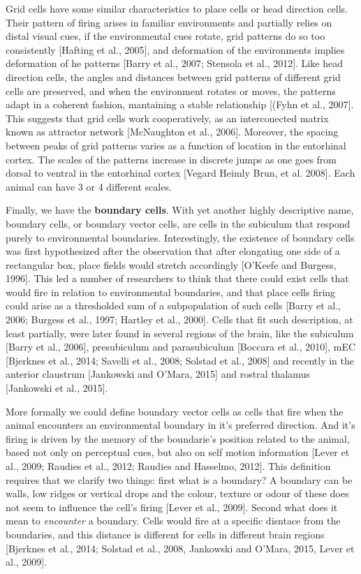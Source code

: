 Grid cells have some similar characteristics to place cells or head direction cells.
Their pattern of firing arises in familiar environments and partially relies on distal visual cues, if the environmental cues rotate, grid patterns do so too consistently [Hafting et al., 2005], and deformation of the environments implies deformation of he patterns [Barry et al., 2007; Stensola et al., 2012].
Like head direction cells, the angles and distances between grid patterns of different grid cells are preserved, and when the environment rotates or moves, the patterns adapt in a coherent fashion, mantaining a stable relationship [(Fyhn et al., 2007].
This suggests that grid cells work cooperatively, as an interconected matrix known as attractor network [McNaughton et al., 2006].
Moreover, the spacing between peaks of grid patterns varies as a function of location in the entorhinal cortex. 
The scales of the patterns increase in discrete jumps as one goes from dorsal to ventral in the entorhinal cortex [Vegard Heimly Brun, et al. 2008].
Each animal can have 3 or 4 different scales. 

Finally, we have the \textbf{boundary cells}.
With yet another highly descriptive name, boundary cells, or boundary vector cells, are cells in the subiculum that respond purely to environmental boundaries.
Interestingly, the existence of boundary cells was first hypothesized after the observation that after elongating one side of a rectangular box, place fields would stretch accordingly [O’Keefe and Burgess, 1996].
This led a number of researchers to think that there could exist cells that would fire in relation to environmental boundaries, and that place cells firing could arise as a thresholded sum of a subpopulation of such cells [Barry et al., 2006; Burgess et al., 1997; Hartley et al., 2000]. 
Cells that fit such description, at least partially, were later found in several regions of the brain, like the subiculum [Barry et al., 2006], presubiculum and parasubiculum [Boccara et al., 2010], mEC [Bjerknes et al., 2014; Savelli et al., 2008; Solstad et al., 2008] and recently in the anterior claustrum [Jankowski and O’Mara, 2015] and rostral thalamus [Jankowski et al., 2015].

More formally we could define boundary vector cells as cells that fire when the animal encounters an environmental boundary in it's preferred direction.
And it's firing is driven by the memory of the boundarie's position related to the animal, based not only on perceptual cues, but also on self motion information [Lever et al., 2009; Raudies et al., 2012; Raudies and Hasselmo, 2012]. 
This definition requires that we clarify two things: first what is a boundary? A boundary can be walls, low ridges or vertical drops and the colour, texture or odour of these does not seem to influence the cell’s firing [Lever et al., 2009].
Second what does it mean to \textit{encounter} a boundary. Cells would fire at a specific disntace from the boundaries, and this distance is different for cells in different brain regions [Bjerknes et al., 2014; Solstad et al., 2008, Jankowski and O’Mara, 2015, Lever et al., 2009].

